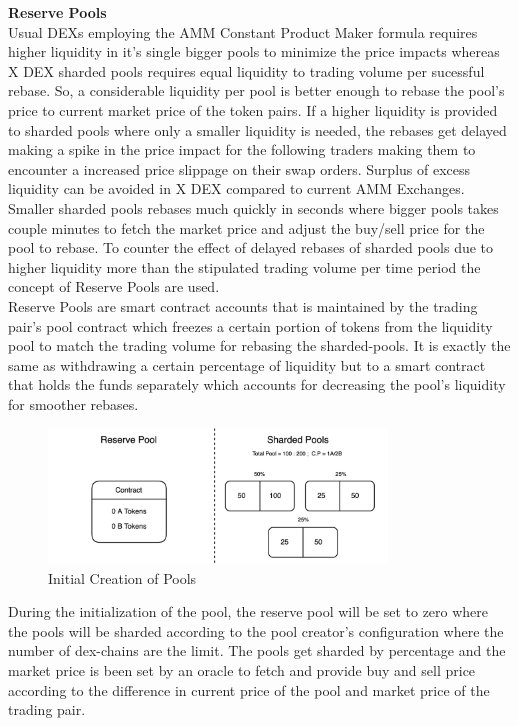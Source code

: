 \documentclass[letterpaper,11pt]{article}
\begin{document}
\textbf{Reserve Pools}\\

Usual DEXs employing the AMM Constant Product Maker formula requires higher liquidity in it's single bigger pools to minimize the price impacts whereas X DEX sharded pools requires equal liquidity to trading volume per sucessful rebase. So, a considerable liquidity per pool is better enough to rebase the pool's price to current market price of the token pairs. If a higher liquidity is provided to sharded pools where only a smaller liquidity is needed, the rebases get delayed making a spike in the price impact for the following traders making them to encounter a increased price slippage on their swap orders. Surplus of excess liquidity can be avoided in X DEX compared to current AMM Exchanges. Smaller sharded pools rebases much quickly in seconds where bigger pools takes couple minutes to fetch the market price and adjust the buy/sell price for the pool to rebase. To counter the effect of delayed rebases of sharded pools due to higher liquidity more than the stipulated trading volume per time period the concept of Reserve Pools are used.\\

Reserve Pools are smart contract accounts that is maintained by the trading pair's pool contract which freezes a certain portion of tokens from the liquidity pool to match the trading volume for rebasing the sharded-pools. It is exactly the same as withdrawing a certain percentage of liquidity but to a smart contract that holds the funds separately which accounts for decreasing the pool's liquidity for smoother rebases.\\

\begin{figure}[H]
\begin{center}
\includegraphics[width=9cm]{reserve-pool-1}
\caption{Initial Creation of Pools}
\end{center}
\end{figure}

During the initialization of the pool, the reserve pool will be set to zero where the pools will be sharded according to the pool creator's configuration where the number of dex-chains are the limit. The pools get sharded by percentage and the market price is been set by an oracle to fetch and provide buy and sell price according to the difference in current price of the pool and market price of the trading pair.\\
\end{document}
